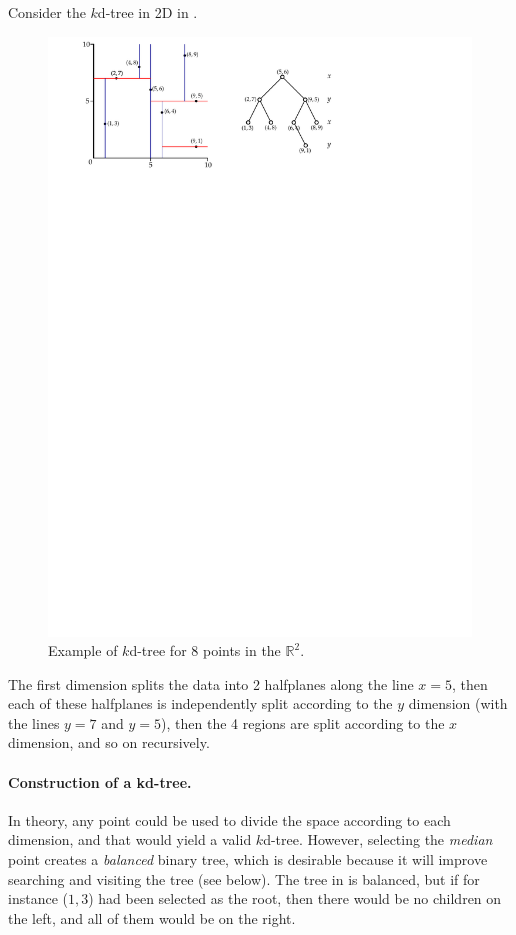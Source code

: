 Consider the $k$d-tree in 2D in .
\begin{figure}[tbp]
  \centering
  \includegraphics[width=0.9\linewidth]{figs/kdtree2}
  \caption{Example of $k$d-tree for 8 points in the $\mathbb{R}^2$.}%
\end{figure}
The first dimension splits the data into 2 halfplanes along the line $x=5$, then each of these halfplanes is independently split according to the $y$ dimension (with the lines $y=7$ and $y=5$), then the 4 regions are split according to the $x$ dimension, and so on recursively.

\paragraph{Construction of a kd-tree.}
In theory, any point could be used to divide the space according to each dimension, and that would yield a valid $k$d-tree.
However, selecting the \emph{median} point creates a \emph{balanced} binary tree,%
which is desirable because it will improve searching and visiting the tree (see below).
The tree in  is balanced, but if for instance ($1,3$) had been selected as the root, then there would be no children on the left, and all of them would be on the right.

